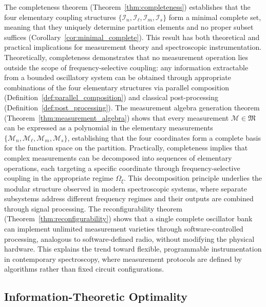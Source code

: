 \documentclass[twocolumn,10pt,a4paper]{article}
\theoremstyle{remark}
\begin{document}
The completeness theorem (Theorem~\ref{thm:completeness}) establishes that the four elementary coupling structures $\{\mathcal{I}_n, \mathcal{I}_\ell, \mathcal{I}_m, \mathcal{I}_s\}$ form a minimal complete set, meaning that they uniquely determine partition elements and no proper subset suffices (Corollary~\ref{cor:minimal_complete}). This result has both theoretical and practical implications for measurement theory and spectroscopic instrumentation. Theoretically, completeness demonstrates that no measurement operation lies outside the scope of frequency-selective coupling: any information extractable from a bounded oscillatory system can be obtained through appropriate combinations of the four elementary structures via parallel composition (Definition~\ref{def:parallel_composition}) and classical post-processing (Definition~\ref{def:post_processing}). The measurement algebra generation theorem (Theorem~\ref{thm:measurement_algebra}) shows that every measurement $\mathcal{M} \in \mathfrak{M}$ can be expressed as a polynomial in the elementary measurements $\{\mathcal{M}_n, \mathcal{M}_\ell, \mathcal{M}_m, \mathcal{M}_s\}$, establishing that the four coordinates form a complete basis for the function space on the partition. Practically, completeness implies that complex measurements can be decomposed into sequences of elementary operations, each targeting a specific coordinate through frequency-selective coupling in the appropriate regime $\Omega_\xi$. This decomposition principle underlies the modular structure observed in modern spectroscopic systems, where separate subsystems address different frequency regimes and their outputs are combined through signal processing. The reconfigurability theorem (Theorem~\ref{thm:reconfigurability}) shows that a single complete oscillator bank can implement unlimited measurement varieties through software-controlled processing, analogous to software-defined radio, without modifying the physical hardware. This explains the trend toward flexible, programmable instrumentation in contemporary spectroscopy, where measurement protocols are defined by algorithms rather than fixed circuit configurations.

\subsection{Information-Theoretic Optimality}
\end{document}
